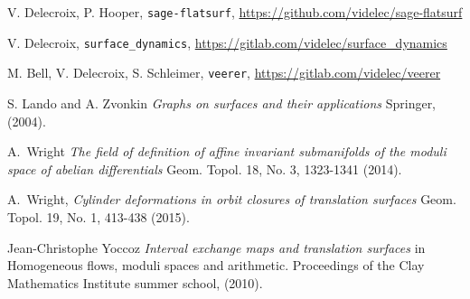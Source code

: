 \documentclass[a4paper,12pt]{article}
\begin{document}
\begin{thebibliography}{sage-flatsurf}

V. Delecroix, P. Hooper,
\texttt{sage-flatsurf},
\url{https://github.com/videlec/sage-flatsurf}

V. Delecroix,
\texttt{surface\_dynamics},
\url{https://gitlab.com/videlec/surface_dynamics}

M. Bell, V. Delecroix, S. Schleimer,
\texttt{veerer},
\url{https://gitlab.com/videlec/veerer}

S. Lando and A. Zvonkin
\textit{Graphs on surfaces and their applications}
Springer, (2004).

A.~Wright
\textit{The field of definition of affine invariant submanifolds of the moduli space of abelian differentials}
Geom. Topol. 18, No. 3, 1323-1341 (2014). 

A.~Wright,
\textit{Cylinder deformations in orbit closures of translation surfaces}
Geom. Topol. 19, No. 1, 413-438 (2015). 

Jean-Christophe Yoccoz
\textit{Interval exchange maps and translation surfaces}
in Homogeneous flows, moduli spaces and arithmetic.
Proceedings of the Clay Mathematics Institute summer school,
(2010).
\end{thebibliography}
\end{document}
